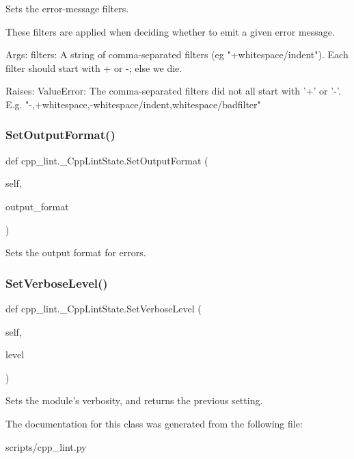 \begin{DoxyVerb}Sets the error-message filters.

These filters are applied when deciding whether to emit a given
error message.

Args:
  filters: A string of comma-separated filters (eg "+whitespace/indent").
       Each filter should start with + or -; else we die.

Raises:
  ValueError: The comma-separated filters did not all start with '+' or '-'.
          E.g. "-,+whitespace,-whitespace/indent,whitespace/badfilter"
\end{DoxyVerb}
 \mbox{\label{classcpp__lint_1_1___cpp_lint_state_a3c1ab0f552461fa7de6640fb98bdb4dc}} 
\subsubsection{\texorpdfstring{Set\+Output\+Format()}{SetOutputFormat()}}
{\footnotesize\ttfamily def cpp\+\_\+lint.\+\_\+\+Cpp\+Lint\+State.\+Set\+Output\+Format (\begin{DoxyParamCaption}\item[{}]{self,  }\item[{}]{output\+\_\+format }\end{DoxyParamCaption})}

\begin{DoxyVerb}Sets the output format for errors.\end{DoxyVerb}
 \mbox{\label{classcpp__lint_1_1___cpp_lint_state_a5f1481dfe5f79dd0927a213ab44d75f7}} 
\subsubsection{\texorpdfstring{Set\+Verbose\+Level()}{SetVerboseLevel()}}
{\footnotesize\ttfamily def cpp\+\_\+lint.\+\_\+\+Cpp\+Lint\+State.\+Set\+Verbose\+Level (\begin{DoxyParamCaption}\item[{}]{self,  }\item[{}]{level }\end{DoxyParamCaption})}

\begin{DoxyVerb}Sets the module's verbosity, and returns the previous setting.\end{DoxyVerb}
 

The documentation for this class was generated from the following file\+:\begin{DoxyCompactItemize}
\item 
scripts/cpp\+\_\+lint.\+py\end{DoxyCompactItemize}
